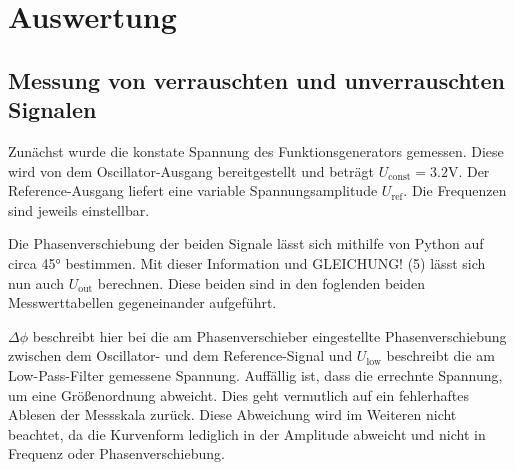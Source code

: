 \section{Auswertung}
\subsection{Messung von verrauschten und unverrauschten Signalen}
\label{sec:Auswertung}

Zunächst wurde die konstate Spannung des Funktionsgenerators gemessen. Diese wird von dem Oscillator-Ausgang bereitgestellt und beträgt $U_\text{const} = 3.2$V\!. Der Reference-Ausgang liefert eine variable Spannungsamplitude $U_\text{ref}$.
Die Frequenzen sind jeweils einstellbar.

Die Phasenverschiebung der beiden Signale lässt sich mithilfe von Python auf circa 45° bestimmen. Mit dieser Information und GLEICHUNG! (5) lässt sich nun auch $U_\text{out}$ berechnen.
Diese beiden sind in den foglenden beiden Messwerttabellen gegeneinander aufgeführt.


$\Delta\phi$ beschreibt hier bei die am Phasenverschieber eingestellte Phasenverschiebung zwischen dem Oscillator- und dem Reference-Signal und $U_\text{low}$ beschreibt die am
Low-Pass-Filter gemessene Spannung. Auffällig ist, dass die errechnte Spannung, um eine Größenordnung abweicht. Dies geht vermutlich auf ein fehlerhaftes Ablesen der Messskala zurück. Diese Abweichung wird im Weiteren nicht beachtet, da die Kurvenform lediglich in der Amplitude abweicht und nicht in Frequenz oder Phasenverschiebung.

